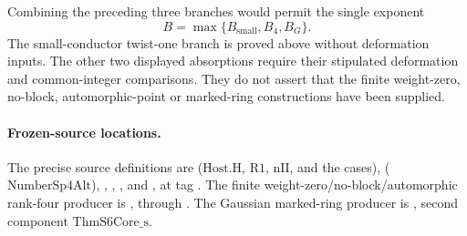 Combining the preceding three branches would permit the single
exponent
\[
                  B=\max\{B_{\mathrm{small}},B_4,B_G\}.
\]
The small-conductor twist-one branch is proved above without
deformation inputs. The other two displayed absorptions require
their stipulated deformation and common-integer comparisons.
They do not assert that the finite weight-zero, no-block,
automorphic-point or marked-ring constructions have been supplied.

\paragraph{Frozen-source locations.}
The precise source definitions are
(\(\mathrm{Host.H}\), \(\mathrm{R1}\), \(\mathrm{nII}\), and the cases),
(\(\mathrm{NumberSp4Alt}\)),
,
,
, and
, at tag
.
The finite weight-zero/no-block/automorphic rank-four producer is
, through
.
The Gaussian marked-ring producer is
, second component
\(\mathrm{ThmS6Core\_s}\).
